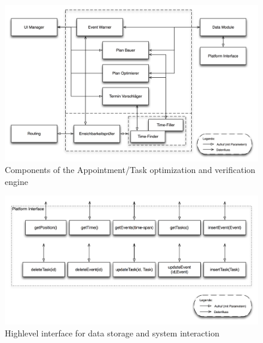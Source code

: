 \begin{figure}[h!]
\centering
\includegraphics[width=16cm]{pics/event_stuff.png}
\caption{Components of the Appointment/Task optimization and verification engine}
\label{event_stuff}
\end{figure}

\begin{figure}[h!]
\centering
\includegraphics[width=16cm]{pics/data_module.png}
\caption{Highlevel interface for data storage and system interaction}
\label{gantt1}
\end{figure}